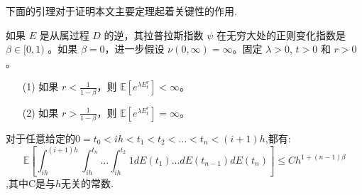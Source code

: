下面的引理对于证明本文主要定理起着关键性的作用.

\begin{lemma}
	
		如果 $E$ 是从属过程 $D$ 的逆，其拉普拉斯指数 $\psi$ 在无穷大处的正则变化指数是 $\beta \in [0, 1)$ 。如果 $\beta = 0$，进一步假设 $\nu(0, \infty) = \infty$。固定 $\lambda > 0$, $t > 0$ 和 $r > 0$。
		\begin{enumerate}
			\item[(1)] 如果 $r < \frac{1}{1 - \beta}$，则 $\mathbb{E}\left[ e^{\lambda E_t^r} \right] < \infty$。
			\item[(2)] 如果 $r > \frac{1}{1 - \beta}$，则 $\mathbb{E}\left[ e^{\lambda E_t^r} \right] = \infty$。
		\end{enumerate}
	
	
\end{lemma}



\begin{lemma}\label{main lemma}
	对于任意给定的$0 = t_0 < ih < t_1 < t_2 < \ldots <t_n <(i+1)h$,都有:
	\begin{equation}
		\mathbb{E}\left[\int_{ih}^{(i+1)h}
		\int_{ih}^{t_n} \ldots \int_{ih}^{t_2} 1 dE(t_1) \ldots dE(t_{n-1})dE(t_n)\right] \le Ch^{1+(n-1)\beta}
	\end{equation}
	,其中C是与$h$无关的常数.
\end{lemma}


